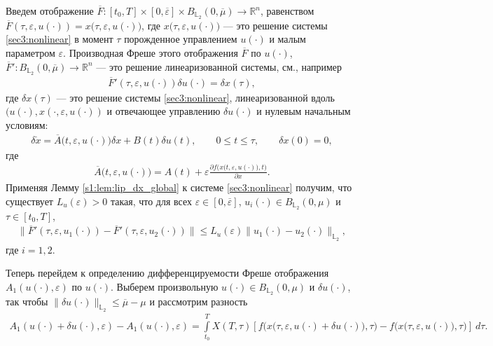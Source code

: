\documentclass[../main.tex]{subfiles}
\begin{document}
Введем отображение $\overline{F}: [t_0,T] \times [0,\overline{\varepsilon}] \times B_{\mathbb{L}_2}(0,\overline{\mu}) \to \mathbb{R}^n$, равенством $\overline{F}(\tau,\varepsilon, u(\cdot)) = x \big(\tau,\varepsilon, u(\cdot)\big) $, где $x \big(\tau,\varepsilon, u(\cdot)\big)$ --- это решение системы \eqref{sec3:nonlinear} в момент $\tau$ порожденное управлением $u(\cdot)$ и малым параметром $\varepsilon$. 
Производная Фреше этого отображения $\overline{F}$ по $u(\cdot)$, $\overline{F}': B_{\mathbb{L}_2}(0,\overline{\mu}) \to \mathbb{R}^n $ --- это решение линеаризованной системы, см., например \cite{GusZyk}
\begin{gather}\label{dF}
 \overline{F}'(\tau,\varepsilon, u(\cdot)) \delta u(\cdot) = \delta x(\tau), 
\end{gather}
где $\delta x(\tau)$ --- это решение системы \eqref{sec3:nonlinear}, линеаризованной вдоль $(u(\cdot),x(\cdot,\varepsilon, u(\cdot))$ и отвечающее управлению $\delta u(\cdot)$ и нулевым начальным условиям:
\begin{gather}\label{dx}
 \delta\dot{x} = \overline{A}\big(t,\varepsilon,u(\cdot)\big) \delta x + B(t)\delta u(t), \qquad 0\leqslant t \leqslant \tau, \qquad \delta x(0) = 0,
\end{gather}
где
\begin{gather*}
 \overline{A}\big(t,\varepsilon,u(\cdot)\big) = A(t) +\varepsilon \frac{\partial f\big(x(t,\varepsilon,u(\cdot)\big),t\big)}{\partial x}.
\end{gather*}
Применяя Лемму \ref{s1:lem:lip_dx_global} к системе \eqref{sec3:nonlinear} получим, что существует $L_u(\varepsilon) > 0$ такая, что для всех $\varepsilon\in [0,\overline{\varepsilon}]$, $u_i(\cdot) \in B_{\mathbb{L}_2}(0,\mu)$ и $\tau \in [t_0,T]$, 
\begin{gather*}
	\| \overline{F}'(\tau,\varepsilon, u_1(\cdot)) - \overline{F}'(\tau,\varepsilon, u_2(\cdot)) \| \leqslant L_u(\varepsilon) \| u_1(\cdot) - u_2(\cdot) \|_{\mathbb{L}_2},
\end{gather*}
где $i = 1,2$.

Теперь перейдем к определению дифференцируемости Фреше отображения $A_1(u(\cdot),\varepsilon)$ по $u(\cdot)$.
Выберем произвольную $u(\cdot) \in B_{\mathbb{L}_2}(0,\mu)$ и $\delta u(\cdot)$, так чтобы $\|\delta u(\cdot)\|_{\mathbb{L}_2} \leqslant \overline{\mu}-\mu$ и рассмотрим разность
\begin{gather}\label{diff_A}
 A_1(u(\cdot) + \delta u(\cdot),\varepsilon) - A_1(u(\cdot),\varepsilon) = \int\limits_{t_0}^T X(T,\tau) \left[ 
 f\Big(x\big(\tau,\varepsilon, u(\cdot) + \delta u(\cdot)\big),\tau\Big) - 
 f\Big(x\big(\tau,\varepsilon, u(\cdot)\big),\tau\Big) \right]\ d\tau.
\end{gather}
\end{document}
